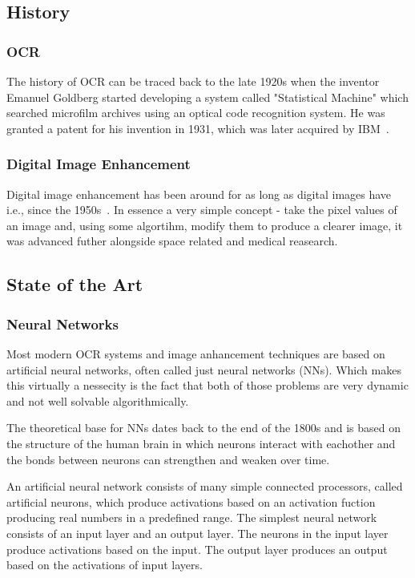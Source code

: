 \documentclass[12pt]{article}
\begin{document}
\subsection{History}

\subsubsection{OCR}

The history of OCR can be traced back to the late 1920s when the inventor Emanuel Goldberg started developing a system called "Statistical Machine" which searched microfilm archives using an optical code recognition system. He was granted a patent for his invention in 1931, which was later acquired by IBM~\cite{1838389}.

\subsubsection{Digital Image Enhancement}

Digital image enhancement has been around for as long as digital images have i.e., since the 1950s~\cite{dipanniversary}. In essence a very simple concept - take the pixel values of an image and, using some algortihm, modify them to produce a clearer image, it was advanced futher alongside space related and medical reasearch.~\cite{Rosenfeld}

\subsection{State of the Art}

\subsubsection{Neural Networks}

Most modern OCR systems and image anhancement techniques are based on artificial neural networks, often called just neural networks (NNs). Which makes this virtually a nessecity is the fact that both of those problems are very dynamic and not well solvable algorithmically.

The theoretical base for NNs dates back to the end of the 1800s and is based on the structure of the human brain in which neurons interact with eachother and the bonds between neurons can strengthen and weaken over time.~\cite{SCHMIDHUBER201585}

An artificial neural network consists of many simple connected processors, called artificial neurons, which produce activations based on an activation fuction producing real numbers in a predefined range. The simplest neural network consists of an input layer and an output layer. The neurons in the input layer produce activations based on the input. The output layer produces an output based on the activations of input layers.~\cite{SCHMIDHUBER201585}
\end{document}
